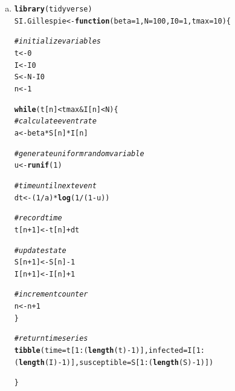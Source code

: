 \documentclass[12pt]{article}\usepackage[]{graphicx}\usepackage[]{color}
\makeatletter
\newcommand{\hlnum}[1]{\textcolor[rgb]{0.686,0.059,0.569}{#1}}%
\newcommand{\hlcom}[1]{\textcolor[rgb]{0.678,0.584,0.686}{\textit{#1}}}%
\newcommand{\hlopt}[1]{\textcolor[rgb]{0,0,0}{#1}}%
\newcommand{\hlstd}[1]{\textcolor[rgb]{0.345,0.345,0.345}{#1}}%
\newcommand{\hlkwa}[1]{\textcolor[rgb]{0.161,0.373,0.58}{\textbf{#1}}}%
\newcommand{\hlkwb}[1]{\textcolor[rgb]{0.69,0.353,0.396}{#1}}%
\newcommand{\hlkwc}[1]{\textcolor[rgb]{0.333,0.667,0.333}{#1}}%
\newcommand{\hlkwd}[1]{\textcolor[rgb]{0.737,0.353,0.396}{\textbf{#1}}}%
\newenvironment{kframe}{%
 \def\at@end@of@kframe{}%
 \ifinner\ifhmode%
  \def\at@end@of@kframe{\end{minipage}}%
  \begin{minipage}{\columnwidth}%
 \fi\fi%
 \def\FrameCommand##1{\hskip\@totalleftmargin \hskip-\fboxsep
 \colorbox{shadecolor}{##1}\hskip-\fboxsep
     \hskip-\linewidth \hskip-\@totalleftmargin \hskip\columnwidth}%
 \MakeFramed {\advance\hsize-\width
   \@totalleftmargin\z@ \linewidth\hsize
   \@setminipage}}%
 {\par\unskip\endMakeFramed%
 \at@end@of@kframe}
\newenvironment{knitrout}{}{} %
\makeatother
\begin{document}
\begin{enumerate}[(a)]

\item \SEa

\begin{knitrout}
\color{fgcolor}\begin{kframe}
\begin{alltt}
\hlkwd{library}\hlstd{(tidyverse)}
\hlstd{SI.Gillespie} \hlkwb{<-} \hlkwa{function}\hlstd{(}\hlkwc{beta} \hlstd{=} \hlnum{1}\hlstd{,} \hlkwc{N} \hlstd{=} \hlnum{100}\hlstd{,} \hlkwc{I0} \hlstd{=} \hlnum{1}\hlstd{,} \hlkwc{tmax}\hlstd{=}\hlnum{10}\hlstd{) \{}

  \hlcom{# initialize variables}
  \hlstd{t} \hlkwb{<-} \hlnum{0}
  \hlstd{I} \hlkwb{<-} \hlstd{I0}
  \hlstd{S} \hlkwb{<-} \hlstd{N} \hlopt{-} \hlstd{I0}
  \hlstd{n} \hlkwb{<-} \hlnum{1}

  \hlkwa{while}\hlstd{(t[n]} \hlopt{<} \hlstd{tmax} \hlopt{&} \hlstd{I[n]} \hlopt{<} \hlstd{N) \{}
    \hlcom{# calculate event rate}
    \hlstd{a} \hlkwb{<-} \hlstd{beta}\hlopt{*}\hlstd{S[n]}\hlopt{*}\hlstd{I[n]}

    \hlcom{# generate uniform random variable}
    \hlstd{u} \hlkwb{<-} \hlkwd{runif}\hlstd{(}\hlnum{1}\hlstd{)}

    \hlcom{# time until next event}
    \hlstd{dt} \hlkwb{<-} \hlstd{(}\hlnum{1}\hlopt{/}\hlstd{a)}\hlopt{*}\hlkwd{log}\hlstd{(}\hlnum{1}\hlopt{/}\hlstd{(}\hlnum{1}\hlopt{-}\hlstd{u))}

    \hlcom{# record time}
    \hlstd{t[n} \hlopt{+} \hlnum{1}\hlstd{]} \hlkwb{<-} \hlstd{t[n]} \hlopt{+} \hlstd{dt}

    \hlcom{# update state}
    \hlstd{S[n}\hlopt{+} \hlnum{1}\hlstd{]} \hlkwb{<-} \hlstd{S[n]} \hlopt{-} \hlnum{1}
    \hlstd{I[n} \hlopt{+} \hlnum{1}\hlstd{]} \hlkwb{<-} \hlstd{I[n]} \hlopt{+} \hlnum{1}

    \hlcom{# increment counter}
    \hlstd{n} \hlkwb{<-} \hlstd{n}\hlopt{+}\hlnum{1}
  \hlstd{\}}

  \hlcom{# return time series}
  \hlkwd{tibble}\hlstd{(}\hlkwc{time} \hlstd{= t[}\hlnum{1}\hlopt{:}\hlstd{(}\hlkwd{length}\hlstd{(t)} \hlopt{-} \hlnum{1}\hlstd{)],} \hlkwc{infected} \hlstd{= I[}\hlnum{1}\hlopt{:}\hlstd{(}\hlkwd{length}\hlstd{(I)} \hlopt{-} \hlnum{1}\hlstd{)],} \hlkwc{susceptible} \hlstd{= S[}\hlnum{1}\hlopt{:}\hlstd{(}\hlkwd{length}\hlstd{(S)} \hlopt{-} \hlnum{1}\hlstd{)])}

\hlstd{\}}
\end{alltt}
\end{kframe}
\end{knitrout}


\end{enumerate}
\end{document}
